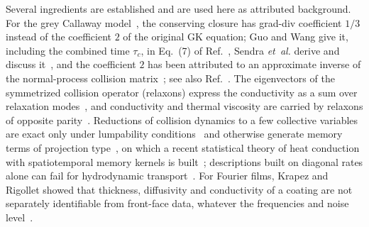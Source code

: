 Several ingredients are established and are used here as attributed background. For the grey Callaway
model~\cite{Callaway1959}, the conserving closure has grad-div coefficient $1/3$ instead of the
coefficient $2$ of the original GK equation; Guo and Wang give it, including the combined time
$\tau_c$, in Eq.~(7) of Ref.~\cite{GuoWang2022}, Sendra \emph{et~al.} derive and discuss it~\cite{Sendra2021,Sendra2022},
and the coefficient $2$ has been attributed to an approximate inverse of the normal-process collision
matrix~\cite{HardyAlbers1974,GuoWang2022}; see also Ref.~\cite{Struchtrup2025}. The eigenvectors of the symmetrized collision operator
(relaxons) express the conductivity as a sum over relaxation modes~\cite{CepellottiMarzari2016}, and
conductivity and thermal viscosity are carried by relaxons of opposite parity~\cite{Simoncelli2020}.
Reductions of collision dynamics to a few collective variables are exact only under lumpability
conditions~\cite{WeiKuo1969,Aoki1968,LiRabitz1989,Buchholz1994} and otherwise generate memory terms of
projection type~\cite{Zwanzig1961,Mori1965}, on which a recent statistical theory of heat conduction with
spatiotemporal memory kernels is built~\cite{ZengDong2026}; descriptions built on diagonal rates alone can fail for
hydrodynamic transport~\cite{MalviyaRavichandran2023}. For Fourier films, Krapez and Rigollet showed that
thickness, diffusivity and conductivity of a coating are not separately identifiable from front-face
data, whatever the frequencies and noise level~\cite{KrapezRigollet2017}.

